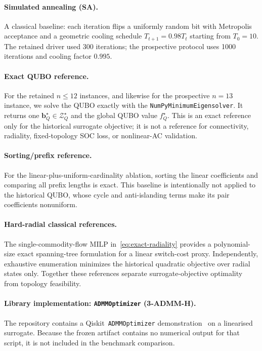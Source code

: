 \documentclass[5p,twocolumn,number,sort&compress,nopreprintline]{elsarticle}
\begin{document}
\paragraph{Simulated annealing (SA).}
A classical baseline: each iteration flips a uniformly random bit
with Metropolis acceptance and a geometric cooling schedule
$T_{t+1}=0.98T_t$ starting from $T_0=10$. The retained driver used
300 iterations; the prospective protocol uses 1000 iterations and
cooling factor $0.995$.

\paragraph{Exact QUBO reference.}
For the retained $n\le12$ instances, and likewise for the prospective
$n=13$ instance, we solve the QUBO exactly with the
\texttt{NumPyMinimumEigensolver}. It returns one
$\boldsymbol b_Q^\star\in\mathcal Z_Q^\star$ and the global QUBO value
$f_Q^\star$. This is an exact reference only for the historical
surrogate objective; it is not a reference for connectivity,
radiality, fixed-topology SOC loss, or nonlinear-AC validation.

\paragraph{Sorting/prefix reference.}
For the linear-plus-uniform-cardinality ablation, sorting the linear
coefficients and comparing all prefix lengths is exact. This baseline
is intentionally not applied to the historical QUBO, whose cycle and
anti-islanding terms make its pair coefficients nonuniform.

\paragraph{Hard-radial classical references.}
The single-commodity-flow MILP in~\eqref{eq:exact-radiality} provides a
polynomial-size exact spanning-tree formulation for a linear switch-cost
proxy. Independently, exhaustive enumeration minimizes the historical
quadratic objective over radial states only. Together these references
separate surrogate-objective optimality from topology feasibility.

\paragraph{Library implementation: \texttt{ADMMOptimizer} (3-ADMM-H).}
The repository contains a Qiskit~\texttt{ADMMOptimizer}
demonstration~\cite{qiskit_admm_optimizer} on a linearised surrogate.
Because the frozen artifact contains no numerical output for that
script, it is not included in the benchmark comparison.
\end{document}
